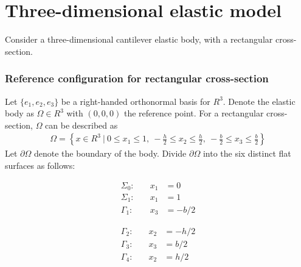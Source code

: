 \documentclass[../../main.tex]{subfiles}
\begin{document}
\section{Three-dimensional elastic model}\label{sec:FEM:3D}
Consider a three-dimensional cantilever elastic body, with a rectangular cross-section.
 
\subsubsection{Reference configuration for rectangular cross-section}
Let $\{e_1,e_2,e_3\}$ be a right-handed orthonormal basis for $R^3$. Denote the elastic body as $\Omega \in R^3$ with $(0,0,0)$ the reference point. For a rectangular cross-section, $\Omega$ can be described as
\begin{eqnarray*}
	\Omega = \left\{ x \in R^3 \ | \ 0 \leq x_1 \leq 1, \ -\frac{h}{2} \leq x_2 \leq \frac{h}{2} , \ -\frac{b}{2} \leq x_3 \leq \frac{b}{2}\right \}
\end{eqnarray*}
Let $\partial \Omega$ denote the boundary of the body. Divide $\partial \Omega$ into the six distinct flat surfaces as follows:


\noindent\begin{minipage}{.5\linewidth}
	\begin{eqnarray*}
		\Sigma_0:& \quad x_1 &= 0\\
		\Sigma_1:& \quad x_1 &= 1\\
		\Gamma_1:& \quad x_3 &= -{b}/{2} 
	\end{eqnarray*}
\end{minipage}%
\begin{minipage}{.5\linewidth}
	\begin{eqnarray*}
		\Gamma_2:& \quad x_2 &= -{h}/{2}\\
		\Gamma_3:& \quad x_3 &= {b}/{2}\\
		\Gamma_4:& \quad x_2 &= {h}/{2} 
	\end{eqnarray*}
\end{minipage}
\end{document}
